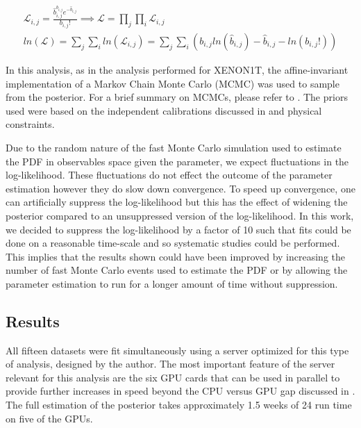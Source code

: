 \begin{equation}
        \label{eqn:nerix_binned_likelihood}
        \begin{gathered}
                \mathcal{L}_{i,j} = \frac{\hat{b}_{i,j}^{b_{i,j}} e^{-\hat{b}_{i,j}}}{b_{i,j}!} \implies \mathcal{L} = \prod_j \prod_i \mathcal{L}_{i,j} \\ 
                ln(\mathcal{L}) = \sum_j \sum_i ln(\mathcal{L}_{i,j}) = \sum_j \sum_i ( b_{i,j} ln(\hat{b}_{i,j}) - \hat{b}_{i,j} - ln(b_{i,j}!) )
        \end{gathered}
\end{equation}


In this analysis, as in the analysis performed for XENON1T, the affine-invariant implementation of a Markov Chain Monte Carlo (MCMC) was used to sample from the posterior.  For a brief summary on MCMCs, please refer to .  The priors used were based on the independent calibrations discussed in  and physical constraints.

Due to the random nature of the fast Monte Carlo simulation used to estimate the PDF in observables space given the parameter, we expect fluctuations in the log-likelihood.  These fluctuations do not effect the outcome of the parameter estimation however they do slow down convergence.  To speed up convergence, one can artificially suppress the log-likelihood but this has the effect of widening the posterior compared to an unsuppressed version of the log-likelihood\cite{anthony2017characterization}.  In this work, we decided to suppress the log-likelihood by a factor of 10 such that fits could be done on a reasonable time-scale and so systematic studies could be performed.  This implies that the results shown could have been improved by increasing the number of fast Monte Carlo events used to estimate the PDF or by allowing the parameter estimation to run for a longer amount of time without suppression. 


\subsection{Results}

All fifteen datasets were fit simultaneously using a server optimized for this type of analysis, designed by the author.  The most important feature of the server relevant for this analysis are the six GPU cards that can be used in parallel to provide further increases in speed beyond the CPU versus GPU gap discussed in .  The full estimation of the posterior takes approximately 1.5 weeks of 24 run time on five of the GPUs.


